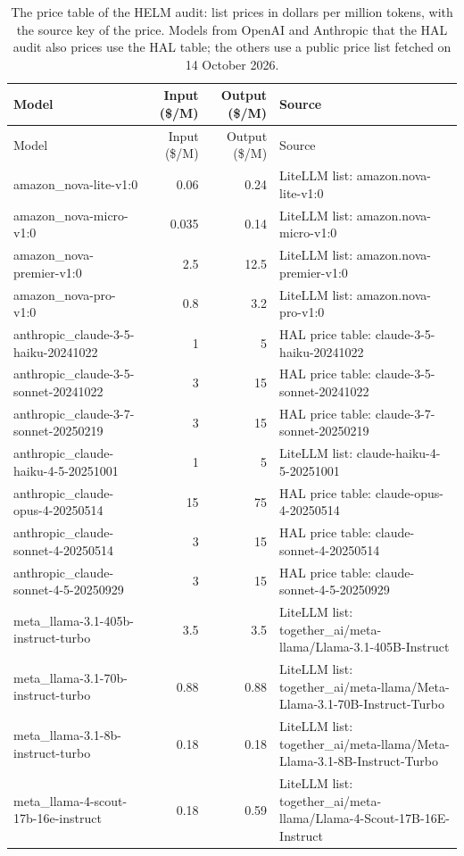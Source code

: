 \begin{longtable}{lrrp{7cm}}
\caption{The price table of the HELM audit: list prices in dollars per million tokens, with the source key of the price. Models from OpenAI and Anthropic that the HAL audit also prices use the HAL table; the others use a public price list fetched on 14 October 2026.}\label{tab:supp-helm-prices}\\
\toprule
Model & Input (\$/M) & Output (\$/M) & Source \\
\midrule
\endfirsthead
\toprule
Model & Input (\$/M) & Output (\$/M) & Source \\
\midrule
\endhead
\bottomrule
\endfoot
amazon\_nova-lite-v1:0 & 0.06 & 0.24 & LiteLLM list: amazon.nova-lite-v1:0 \\
amazon\_nova-micro-v1:0 & 0.035 & 0.14 & LiteLLM list: amazon.nova-micro-v1:0 \\
amazon\_nova-premier-v1:0 & 2.5 & 12.5 & LiteLLM list: amazon.nova-premier-v1:0 \\
amazon\_nova-pro-v1:0 & 0.8 & 3.2 & LiteLLM list: amazon.nova-pro-v1:0 \\
anthropic\_claude-3-5-haiku-20241022 & 1 & 5 & HAL price table: claude-3-5-haiku-20241022 \\
anthropic\_claude-3-5-sonnet-20241022 & 3 & 15 & HAL price table: claude-3-5-sonnet-20241022 \\
anthropic\_claude-3-7-sonnet-20250219 & 3 & 15 & HAL price table: claude-3-7-sonnet-20250219 \\
anthropic\_claude-haiku-4-5-20251001 & 1 & 5 & LiteLLM list: claude-haiku-4-5-20251001 \\
anthropic\_claude-opus-4-20250514 & 15 & 75 & HAL price table: claude-opus-4-20250514 \\
anthropic\_claude-sonnet-4-20250514 & 3 & 15 & HAL price table: claude-sonnet-4-20250514 \\
anthropic\_claude-sonnet-4-5-20250929 & 3 & 15 & HAL price table: claude-sonnet-4-5-20250929 \\
meta\_llama-3.1-405b-instruct-turbo & 3.5 & 3.5 & LiteLLM list: together\_ai/meta-llama/Llama-3.1-405B-Instruct \\
meta\_llama-3.1-70b-instruct-turbo & 0.88 & 0.88 & LiteLLM list: together\_ai/meta-llama/Meta-Llama-3.1-70B-Instruct-Turbo \\
meta\_llama-3.1-8b-instruct-turbo & 0.18 & 0.18 & LiteLLM list: together\_ai/meta-llama/Meta-Llama-3.1-8B-Instruct-Turbo \\
meta\_llama-4-scout-17b-16e-instruct & 0.18 & 0.59 & LiteLLM list: together\_ai/meta-llama/Llama-4-Scout-17B-16E-Instruct \\

\end{longtable}
